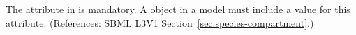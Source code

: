 The attribute  in \Species is mandatory.  A \Species
object in a model must include a value for this attribute.  (References:
SBML L3V1 Section~\ref{sec:species-compartment}.)
